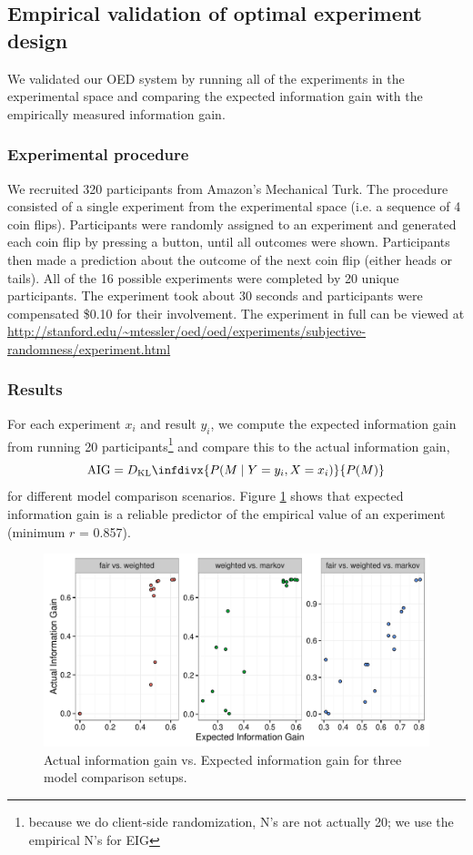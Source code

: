 \documentclass{article}
\newcommand{\dkl}{D_\mathrm{KL}\infdivx}
\begin{document}


\subsection{Empirical validation of optimal experiment design}
We validated our OED system by running all of the experiments in the experimental space and comparing the expected information gain with the empirically measured information gain.

\subsubsection{Experimental procedure}

We recruited 320 participants from Amazon's Mechanical Turk. The procedure consisted of a single experiment from the experimental space (i.e. a sequence of 4 coin flips). Participants were randomly assigned to an experiment and generated each coin flip by pressing a button, until all outcomes were shown. Participants then made a prediction about the outcome of the next coin flip (either heads or tails). All of the 16 possible experiments were completed by 20 unique participants. The experiment took about 30 seconds and participants were compensated \$0.10 for their involvement. The experiment in full can be viewed at \url{http://stanford.edu/~mtessler/oed/oed/experiments/subjective-randomness/experiment.html}

\subsubsection{Results}

For each experiment $x_i$ and result $y_i$, we compute the expected information gain from running 20 participants\footnote{because we do client-side randomization, N's are not actually 20; we use the empirical N's for EIG} and compare this to the actual information gain,
$$\mathrm{AIG} = \dkl{P(M \mid Y = y_i, X = x_i)}{P(M)}$$
for different model comparison scenarios.
Figure \ref{fig:aig_vs_eig} shows that expected information gain is a reliable predictor of the empirical value of an experiment (minimum $r$ = 0.857).

\begin{figure}[h!]
\centering
\includegraphics[width=0.7\columnwidth]{img/coin_eig_aig_scatter_noText.pdf}
\caption{Actual information gain vs. Expected information gain for three model comparison setups.}
\label{fig:aig_vs_eig}
\end{figure}
\end{document}
